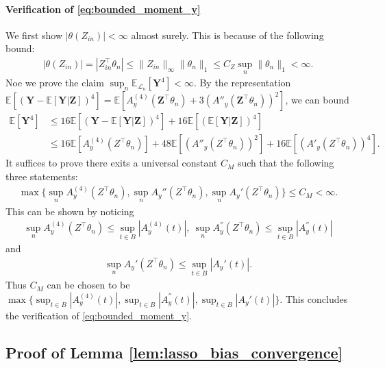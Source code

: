 \documentclass[12pt]{article}
\theoremstyle{definition}
\newcommand{\E}{\mathbb E}								%
\newcommand{\prz}{\bm Z}								%
\newcommand{\srz}{Z}									%
\newcommand{\pry}{{\bm Y}}								%
\newcommand{\law}{\mathcal L}							%
\begin{document}
\paragraph{Verification of \eqref{eq:bounded_moment_y}}

We first show $|\theta(\srz_{in})|<\infty$ almost surely. This is because of the following bound:
\begin{align*}
  |\theta(\srz_{in})|=|\srz_{in}^\top\theta_n|\leq \|\srz_{in}\|_\infty\|\theta_n\|_{1}\leq C_Z\sup_n\|\theta_n\|_1<\infty.
\end{align*}
Noe we prove the claim $\sup_n\E_{\law_n}[\pry^4]<\infty$. By the representation $\E[(\pry-\E[\pry|\prz])^4]=\E[A^{(4)}_y(\prz^\top \theta_n)+3(A''_y(\prz^\top \theta_n))^2]$, we can bound
\begin{align*}
  \E[\pry^4]
  &
  \leq 16\E[(\pry-\E[\pry|\prz])^4]+16\E[(\E[\pry|\prz])^4]\\
  &
  \leq 16\E[A^{(4)}_y(\srz^\top \theta_n)]+48\E[(A''_y(\srz^\top \theta_n))^2]+16\E[(A'_y(\srz^\top \theta_n))^4].
\end{align*}
It suffices to prove there exits a universal constant $C_M$ such that the following three statements:
\begin{align*}
  \max\{\sup_n A_y^{(4)}(\srz^\top \theta_n), \sup_n A_y''(\srz^\top \theta_n),\sup_n A_y'(\srz^\top \theta_n)\}\leq C_M<\infty.
\end{align*}
This can be shown by noticing 
\begin{align*}
  \sup_n A_y^{(4)}(\srz^\top \theta_n)\leq \sup_{t\in B}|A_y^{(4)}(t)|,\ \sup_n A_y^{''}(\srz^\top \theta_n)\leq \sup_{t\in B}|A_y^{''}(t)|
\end{align*}
and 
\begin{align*}
  \sup_n A_y'(\srz^\top \theta_n)\leq \sup_{t\in B}|A_y'(t)|.
\end{align*}
Thus $C_M$ can be chosen to be $\max\{\sup_{t\in B}|A_y^{(4)}(t)|,\sup_{t\in B}|A_y^{''}(t)|,\sup_{t\in B}|A_y'(t)|\}$. This concludes the verification of \eqref{eq:bounded_moment_y}.


\subsection{Proof of Lemma \ref{lem:lasso_bias_convergence}}
\end{document}
